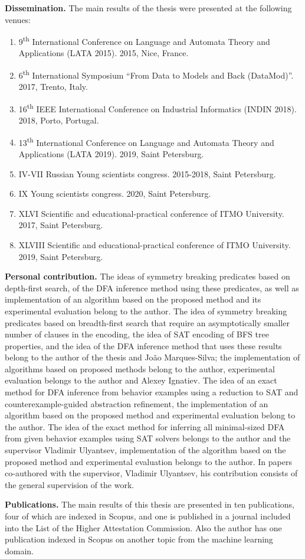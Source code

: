 \textbf{Dissemination.}
The main results of the thesis were presented at the following venues:
\begin{enumerate}
  \item 9\textsuperscript{th} International Conference on Language and Automata Theory and Applications (LATA 2015). 2015, Nice, France.
  \item 6\textsuperscript{th} International Symposium ``From Data to Models and Back (DataMod)''. 2017, Trento, Italy.
  \item 16\textsuperscript{th} IEEE International Conference on Industrial Informatics (INDIN 2018). 2018, Porto, Portugal.
  \item 13\textsuperscript{th} International Conference on Language and Automata Theory and Applications (LATA 2019). 2019, Saint Petersburg.
  \item IV-VII Russian Young scientists congress. 2015-2018, Saint Petersburg.
  \item IX Young scientists congress. 2020, Saint Petersburg.
  \item XLVI Scientific and educational-practical conference of ITMO University. 2017, Saint Petersburg.
  \item XLVIII Scientific and educational-practical conference of ITMO University. 2019, Saint Petersburg.
\end{enumerate}

\textbf{Personal contribution.}
The ideas of symmetry breaking predicates based on depth-first search, of the DFA inference method using these predicates, as well as implementation of an algorithm
based on the proposed method and its experimental evaluation belong to the author.
The idea of symmetry breaking predicates based on breadth-first search that require an asymptotically smaller number of clauses in the encoding, the idea of
SAT encoding of BFS tree properties, and the idea of the DFA inference method that uses these results belong to the author of the thesis and Jo{\~{a}}o Marques-Silva;
the implementation of algorithms based on proposed methods belong to the author, experimental evaluation belongs to the author and Alexey Ignatiev.
The idea of an exact method for DFA inference from behavior examples using a reduction to SAT and counterexample-guided abstraction refinement,
the implementation of an algorithm based on the proposed method and experimental evaluation belong to the author.
The idea of the exact method for inferring all minimal-sized DFA from given behavior examples using SAT solvers belongs to the author and the supervisor Vladimir Ulyantsev,
implementation of the algorithm based on the proposed method and experimental evaluation belongs to the author.
In papers co-authored with the supervisor, Vladimir Ulyantsev, his contribution consists of the general supervision of the work.

\textbf{Publications.}
The main results of this thesis are presented in ten publications, four of which are indexed in Scopus, and one is published in a journal included into the 
List of the Higher Attestation Commission.
Also the author has one publication indexed in Scopus on another topic from the machine learning domain.